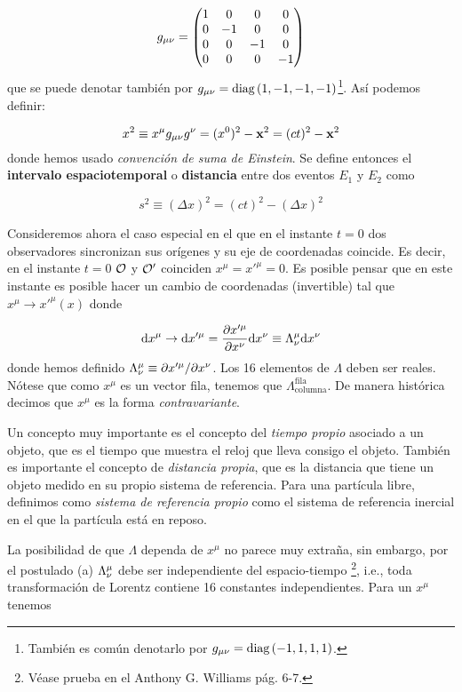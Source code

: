 \begin{equation}
	g_{\mu \nu} = \mqty(\dmat[0]{1,-1,-1,-1})
\end{equation} 
que se puede denotar también por $g_{\mu \nu} = \text{diag} \left( 1,-1,-1,-1 \right)$\footnote{También es común denotarlo por $g_{\mu \nu} = \text{diag} \left( -1,1,1,1 \right)$.}. Así podemos definir:

\begin{equation}
	x^2 \equiv x^\mu g_{\mu \nu} g^\nu = (x^0)^2 - \mathbf{x}^2 = (ct)^2 - \mathbf{x}^2
\end{equation}
donde hemos usado \textit{convención de suma de Einstein}. Se define entonces el \textbf{intervalo espaciotemporal} o \textbf{distancia} entre dos eventos $E_1$ y $E_2$ como

\begin{equation}
	s^2 \equiv (\Delta x)^2 = (ct)^2 - (\Delta x)^2 
\end{equation}

Consideremos ahora el caso especial en el que en el instante $t=0$ dos observadores sincronizan sus orígenes y su eje de coordenadas coincide. Es decir, en el instante $t=0$ $\mathcal{O}$ y $\mathcal{O}'$ coinciden $x^\mu = x'^\mu=0$. Es posible pensar que en este instante es posible hacer un cambio de coordenadas (invertible) tal que $x^\mu\rightarrow x'^\mu(x)$ donde

\begin{equation}
	\mathrm{d} x^\mu \rightarrow \mathrm{d} x'^\mu = \frac{\partial x'^\mu}{\partial x^\nu} \mathrm{d} x^\nu \equiv \Lambda^\mu_\nu \mathrm{d} x^\nu
\end{equation}
donde hemos definido $\Lambda^\mu_\nu\equiv\partial x'^\mu / \partial x^\nu$. Los 16 elementos de $\Lambda$ deben ser reales. Nótese que como $x^\mu$ es un vector fila, tenemos que $\Lambda^{\text{fila}}_{\text{columna}}$. De manera histórica decimos que $x^\mu$ es la forma \textit{contravariante}.

Un concepto muy importante es el concepto del \textit{tiempo propio} asociado a un objeto, que es el tiempo que muestra el reloj que lleva consigo el objeto. También es importante el concepto de \textit{distancia propia}, que es la distancia que tiene un objeto medido en su propio sistema de referencia. Para una partícula libre, definimos como \textit{sistema de referencia propio} como el sistema de referencia inercial en el que la partícula está en reposo.

La posibilidad de que $\Lambda$ dependa de $x^\mu$ no parece muy extraña, sin embargo, por el postulado (a) $\Lambda^\mu_\nu$ debe ser independiente del espacio-tiempo \footnote{Véase prueba en el Anthony G. Williams pág. 6-7.}, i.e., toda transformación de Lorentz contiene 16 constantes independientes. Para un $x^\mu$ tenemos 

